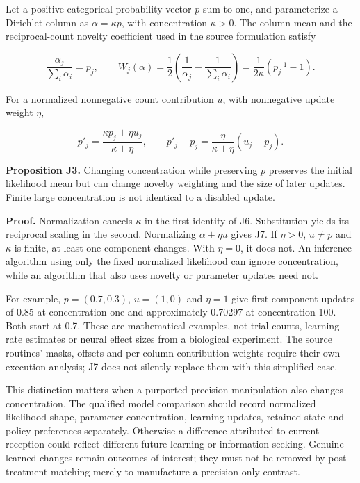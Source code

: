 \documentclass[
  american,
  11pt,
  letterpaper,
]{article}
\begin{document}
Let a positive categorical probability vector \(p\) sum to one, and parameterize a Dirichlet column as \(\alpha=\kappa p\), with concentration \(\kappa>0\). The column mean and the reciprocal-count novelty coefficient used in the source formulation satisfy

\begin{equation}
\frac{\alpha_j}{\sum_i\alpha_i}=p_j,\qquad
W_j(\alpha)=\frac12\left(\frac1{\alpha_j}-\frac1{\sum_i\alpha_i}\right)
           =\frac1{2\kappa}(p_j^{-1}-1).
\tag{J6}
\end{equation}

For a normalized nonnegative count contribution \(u\), with nonnegative update weight \(\eta\),

\begin{equation}
p'_j=\frac{\kappa p_j+\eta u_j}{\kappa+\eta},\qquad
p'_j-p_j=\frac{\eta}{\kappa+\eta}(u_j-p_j).
\tag{J7}
\end{equation}

\textbf{Proposition J3.} Changing concentration while preserving \(p\) preserves the initial likelihood mean but can change novelty weighting and the size of later updates. Finite large concentration is not identical to a disabled update.

\textbf{Proof.} Normalization cancels \(\kappa\) in the first identity of J6. Substitution yields its reciprocal scaling in the second. Normalizing \(\alpha+\eta u\) gives J7. If \(\eta>0\), \(u\ne p\) and \(\kappa\) is finite, at least one component changes. With \(\eta=0\), it does not. An inference algorithm using only the fixed normalized likelihood can ignore concentration, while an algorithm that also uses novelty or parameter updates need not.

For example, \(p=(0.7,0.3)\), \(u=(1,0)\) and \(\eta=1\) give first-component updates of 0.85 at concentration one and approximately 0.70297 at concentration 100. Both start at 0.7. These are mathematical examples, not trial counts, learning-rate estimates or neural effect sizes from a biological experiment. The source routines' masks, offsets and per-column contribution weights require their own execution analysis; J7 does not silently replace them with this simplified case.

This distinction matters when a purported precision manipulation also changes concentration. The qualified model comparison should record normalized likelihood shape, parameter concentration, learning updates, retained state and policy preferences separately. Otherwise a difference attributed to current reception could reflect different future learning or information seeking. Genuine learned changes remain outcomes of interest; they must not be removed by post-treatment matching merely to manufacture a precision-only contrast.
\end{document}
